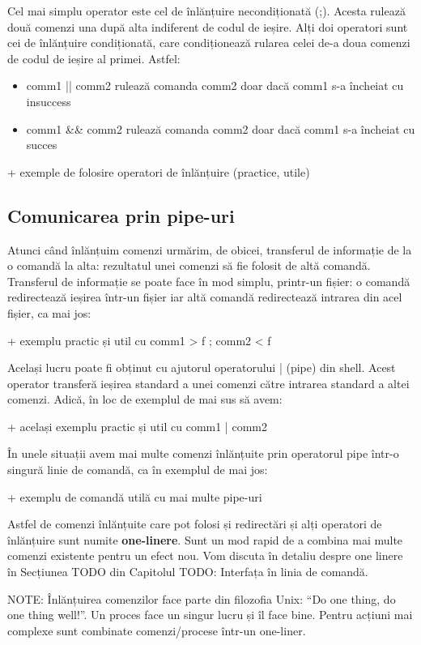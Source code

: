 Cel mai simplu operator este cel de înlănțuire necondiționată (;). Acesta
rulează două comenzi una după alta indiferent de codul de ieșire. Alți doi
operatori sunt cei de înlănțuire condiționată, care condiționează rularea celei
de-a doua comenzi de codul de ieșire al primei. Astfel:

\begin{itemize}
	\item comm1 || comm2 rulează comanda comm2 doar dacă comm1 s-a încheiat cu insuccess
	\item comm1 \&\& comm2 rulează comanda comm2 doar dacă comm1 s-a încheiat cu succes
\end{itemize}

+ exemple de folosire operatori de înlănțuire (practice, utile)

\subsection{Comunicarea prin pipe-uri}
\label{sec:procese-operatii-pipe}

Atunci când înlănțuim comenzi urmărim, de obicei, transferul de informație de la
o comandă la alta: rezultatul unei comenzi să fie folosit de altă comandă.
Transferul de informație se poate face în mod simplu, printr-un fișier: o
comandă redirectează ieșirea într-un fișier iar altă comandă redirectează
intrarea din acel fișier, ca mai jos:

+     exemplu practic și util cu comm1 > f ; comm2 < f

Același lucru poate fi obținut cu ajutorul operatorului | (pipe) din shell.
Acest operator transferă ieșirea standard a unei comenzi către intrarea standard
a altei comenzi. Adică, în loc de exemplul de mai sus să avem:

+     același exemplu practic și util cu comm1 | comm2

În unele situații avem mai multe comenzi înlănțuite prin operatorul pipe într-o
singură linie de comandă, ca în exemplul de mai jos:

+     exemplu de comandă utilă cu mai multe pipe-uri

Astfel de comenzi înlănțuite care pot folosi și redirectări și alți operatori de
înlănțuire sunt numite \textbf{one-linere}. Sunt un mod rapid de a combina mai multe
comenzi existente pentru un efect nou. Vom discuta în detaliu despre one linere
în Secțiunea TODO din Capitolul TODO: Interfața în linia de comandă.

NOTE: Înlănțuirea comenzilor face parte din filozofia Unix: “Do one thing, do
one thing well!”. Un proces face un singur lucru și îl face bine. Pentru acțiuni
mai complexe sunt combinate comenzi/procese într-un one-liner.

